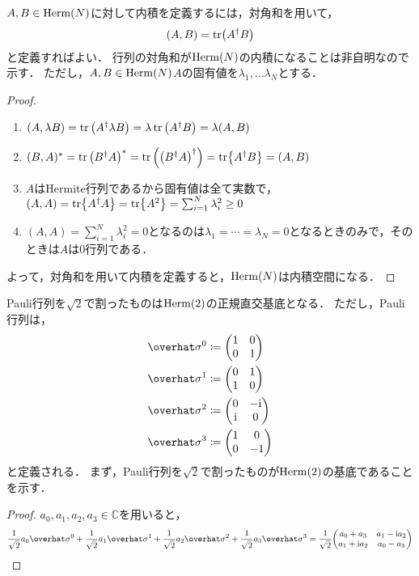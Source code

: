 \documentclass{report}
\begin{document}
    $A, B\in \r{Herm}(N)$に対して内積を定義するには，対角和を用いて，
    \begin{align}
      (A, B) = \tr(A^{\dag}B)
    \end{align}
    と定義すればよい．
    行列の対角和が$\r{Herm}(N)$の内積になることは非自明なので示す．
    ただし，$A, B\in \r{Herm}(N)$$A$の固有値を$\lambda_1, \dots \lambda_N$とする．
    \begin{proof}
      \begin{enumerate}
        \item $(A, \lambda B) = \tr\qty(A^{\dag}\lambda B) = \lambda\tr\qty(A^{\dag}B) = \lambda(A, B)$
        \item $(B, A)^* = \tr\qty(B^{\dag}A)^* = \tr\qty(\qty(B^{\dag}A)^{\dag}) = \tr{A^{\dag}B} = (A, B)$
        \item $A$はHermite行列であるから固有値は全て実数で，$(A, A) = \tr{A^{\dag}A} = \tr{A^2} = \sum_{i = 1}^{N}\lambda^2_i \geq 0$
        \item $(A, A) = \sum_{i = 1}^{N}\lambda^2_i = 0$となるのは$\lambda_1 = \cdots = \lambda_N = 0$となるときのみで，そのときは$A$は0行列である．
      \end{enumerate}
      よって，対角和を用いて内積を定義すると，$\r{Herm}(N)$は内積空間になる．
    \end{proof}
    Pauli行列を$\sqrt{2}$で割ったものは$\rm{Herm}(2)$の正規直交基底となる．
    ただし，Pauli行列は，
    \begin{align}
      \hat{\sigma}^0 &\coloneqq \mqty(1 & 0 \\ 0 & 1) \\ 
      \hat{\sigma}^1 &\coloneqq \mqty(0 & 1 \\ 1 & 0) \\ 
      \hat{\sigma}^2 &\coloneqq \mqty(0 & -\i \\ \i & 0) \\ 
      \hat{\sigma}^3 &\coloneqq \mqty(1 & 0 \\ 0 & -1)
    \end{align}
    と定義される．
    まず，Pauli行列を$\sqrt{2}$で割ったものが$\r{Herm}(2)$の基底であることを示す．
    \begin{proof}
      $a_0, a_1, a_2, a_3 \in \mathbb{C}$を用いると，
      \begin{align}
        \frac{1}{\sqrt{2}}a_0\hat{\sigma}^0 + \frac{1}{\sqrt{2}}a_1\hat{\sigma}^1 + \frac{1}{\sqrt{2}}a_2\hat{\sigma}^2 + \frac{1}{\sqrt{2}}a_3\hat{\sigma}^3 = \frac{1}{\sqrt{2}}\mqty(a_0 + a_3 & a_1 - \i a_2 \\ a_1 + \i a_2 & a_0 - a_3) 

\end{align}
\end{proof}$$
\end{document}
